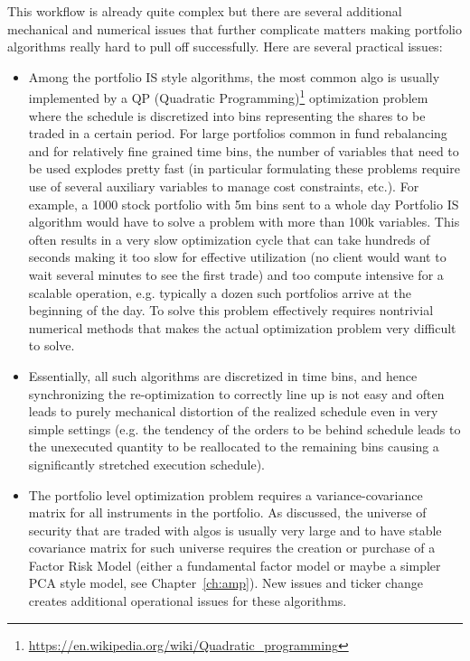 This workflow is already quite complex but there are several additional mechanical and numerical issues that further complicate matters making portfolio algorithms really hard to pull off successfully. Here are several practical issues:
\begin{itemize}
\item Among the portfolio IS style algorithms, the most common algo is usually implemented by a QP (Quadratic Programming)\footnote{\url{https://en.wikipedia.org/wiki/Quadratic_programming}} optimization problem where the schedule is discretized into bins representing the shares to be traded in a certain period. For large portfolios common in fund rebalancing and for relatively fine grained time bins, the number of variables that need to be used explodes pretty fast (in particular formulating these problems require use of several auxiliary variables to manage cost constraints, etc.). For example, a 1000 stock portfolio with 5m bins  sent to a whole day Portfolio IS algorithm would have to solve a problem with more than 100k variables. This often results in a very slow  optimization cycle that can take hundreds of seconds making it too slow for effective utilization (no client would want to wait several minutes to see the first trade) and too compute intensive for a scalable operation, e.g. typically a dozen such portfolios arrive at the beginning of the day. To solve this problem effectively requires nontrivial numerical methods that makes the actual optimization problem very difficult to solve.

\item Essentially, all such algorithms are discretized in time bins, and hence synchronizing the re-optimization to correctly line up is not easy and often leads to purely mechanical distortion of the realized schedule even in very simple settings (e.g. the tendency of the orders to be behind schedule leads to the unexecuted quantity to be reallocated to the remaining bins causing a significantly stretched execution schedule).

\item The portfolio level optimization problem requires a variance-covariance matrix for all instruments in the portfolio. As discussed, the universe of security that are traded with algos is usually very large and to have stable covariance matrix for such universe requires the creation or purchase of a Factor Risk Model (either a fundamental factor model or maybe a simpler PCA style model, see Chapter~\ref{ch:amp}). New issues and ticker change creates additional operational issues for these algorithms.


\end{itemize}
